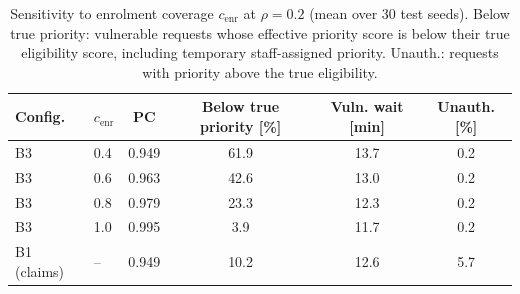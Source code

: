 \begin{table}[!t]
\caption{Sensitivity to enrolment coverage $c_{\mathrm{enr}}$ at $\rho=0.2$ (mean over 30 test seeds). Below true priority: vulnerable requests whose effective priority score is below their true eligibility score, including temporary staff-assigned priority. Unauth.: requests with priority above the true eligibility.}
\label{tabenr}
\centering\footnotesize
\begin{tabular}{llcccc}
\toprule
Config. & $c_{\mathrm{enr}}$ & PC & Below true priority [\%] & Vuln. wait [min] & Unauth. [\%] \\
\midrule
B3 & 0.4 & 0.949 & 61.9 & 13.7 & 0.2 \\
B3 & 0.6 & 0.963 & 42.6 & 13.0 & 0.2 \\
B3 & 0.8 & 0.979 & 23.3 & 12.3 & 0.2 \\
B3 & 1.0 & 0.995 & 3.9 & 11.7 & 0.2 \\
\midrule
B1 (claims) & -- & 0.949 & 10.2 & 12.6 & 5.7 \\
\bottomrule
\end{tabular}
\end{table}
